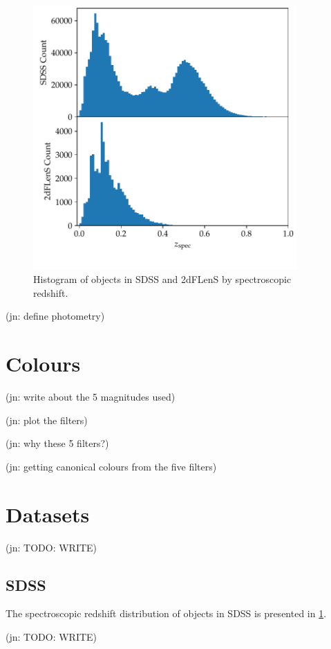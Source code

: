 \documentclass[11pt,twoside]{report}
\newcommand\jn[1]{{\color{red}(jn: #1)}}
\begin{document}
  \begin{figure}
    \centering
    \includegraphics[width=0.9\textwidth]{zpec_hist.pdf}
    \caption{Histogram of objects in SDSS and 2dFLenS by spectroscopic redshift.}
    \label{fig:spec_hist}
  \end{figure}

  \jn{define photometry}

  \section{Colours}

  \jn{write about the 5 magnitudes used}

  \jn{plot the filters}

  \jn{why these 5 filters?}

  \jn{getting canonical colours from the five filters}

  \section{Datasets}
  \jn{TODO: WRITE}

  \subsection{SDSS}
  The spectroscopic redshift distribution of objects in SDSS is presented in \cref{fig:spec_hist}.

  \jn{TODO: WRITE}
\end{document}
